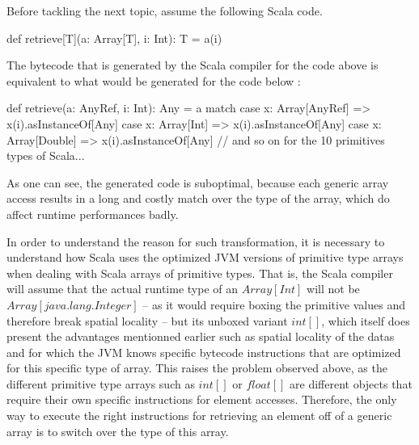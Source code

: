 
Before tackling the next topic, assume the following Scala code.

\begin{lstlisting-nobreak}
  def retrieve[T](a: Array[T], i: Int): T = {
    a(i)
  }
\end{lstlisting-nobreak}

The bytecode that is generated by the Scala compiler for the code above is equivalent to what would be generated for the code below : 

\begin{lstlisting-nobreak}
  def retrieve(a: AnyRef, i: Int): Any = {
    a match {
      case x: Array[AnyRef] => x(i).asInstanceOf[Any]
      case x: Array[Int] => x(i).asInstanceOf[Any]
      case x: Array[Double] => x(i).asInstanceOf[Any]
      // and so on for the 10 primitives types of Scala...
    }
  }
\end{lstlisting-nobreak}

As one can see, the generated code is suboptimal, because each generic array access results in a long and costly match over the type of the array, which do affect runtime performances badly.  


In order to understand the reason for such transformation, it is necessary to understand how Scala uses the optimized JVM versions of primitive type arrays when dealing with Scala arrays of primitive types. That is, the Scala compiler will assume that the actual runtime type of an $Array[Int]$ will not be $Array[java.lang.Integer]$ -- as it would require boxing the primitive values and therefore break spatial locality -- but its unboxed variant $int[]$, which itself does present the advantages mentionned earlier such as spatial locality of the datas and for which the JVM knows specific bytecode instructions that are optimized for this specific type of array. This raises the problem observed above, as the different primitive type arrays such as $int[]$ or $float[]$ are different objects that require their own specific instructions for element accesses. Therefore, the only way to execute the right instructions for retrieving an element off of a generic array is to switch over the type of this array.

